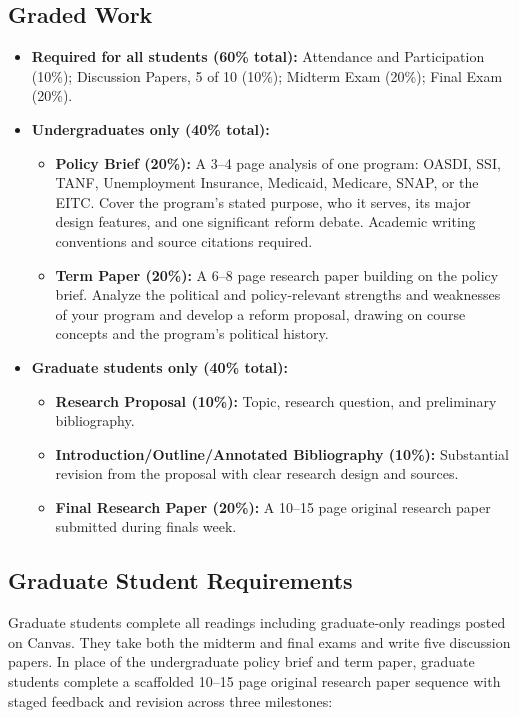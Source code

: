 \documentclass[12pt]{article}
\begin{document}
\subsection*{Graded Work}

\begin{itemize}
    \item \textbf{Required for all students (60\% total):} Attendance and Participation (10\%); Discussion Papers, 5 of 10 (10\%); Midterm Exam (20\%); Final Exam (20\%).
    \item \textbf{Undergraduates only (40\% total):}
    \begin{itemize}
        \item \textbf{Policy Brief (20\%):} A 3--4 page analysis of one program: OASDI, SSI, TANF, Unemployment Insurance, Medicaid, Medicare, SNAP, or the EITC. Cover the program's stated purpose, who it serves, its major design features, and one significant reform debate. Academic writing conventions and source citations required.
        \item \textbf{Term Paper (20\%):} A 6--8 page research paper building on the policy brief. Analyze the political and policy-relevant strengths and weaknesses of your program and develop a reform proposal, drawing on course concepts and the program's political history.
    \end{itemize}
    \item \textbf{Graduate students only (40\% total):}
    \begin{itemize}
        \item \textbf{Research Proposal (10\%):} Topic, research question, and preliminary bibliography.
        \item \textbf{Introduction/Outline/Annotated Bibliography (10\%):} Substantial revision from the proposal with clear research design and sources.
        \item \textbf{Final Research Paper (20\%):} A 10--15 page original research paper submitted during finals week.
    \end{itemize}
\end{itemize}

\subsection*{Graduate Student Requirements}
Graduate students complete all readings including graduate-only readings posted on Canvas. They take both the midterm and final exams and write five discussion papers. In place of the undergraduate policy brief and term paper, graduate students complete a scaffolded 10--15 page original research paper sequence with staged feedback and revision across three milestones:
\end{document}
